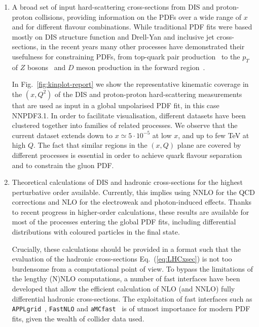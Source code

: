 \begin{enumerate}
\item A broad set of input hard-scattering cross-sections from DIS and proton-proton collisions, providing information on the PDFs
  over a wide range of $x$ and for different flavour combinations.
  While traditional PDF fits were based mostly on DIS structure function and Drell-Yan
  and inclusive jet
  cross-sections, in the recent years many other processes have demonstrated
  their usefulness for constraining PDFs, from top-quark pair production~\cite{Czakon:2016olj}
  to the $p_T$ of $Z$ bosons~\cite{Boughezal:2017nla}
  and $D$ meson production in the forward region~\cite{Gauld:2016kpd}.

  In Fig.~\ref{fig:kinplot-report} we show the representative kinematic coverage in the
    $(x,Q^2)$ of the DIS and proton-proton hard-scattering measurements that are
    used as input in a global unpolarised PDF fit, in this case NNPDF3.1.
    In order to facilitate visualisation, different
    datasets have been clustered together into families of
    related processes.
    We observe that the current dataset extends down to $x\simeq 5\cdot 10^{-5}$
    at low $x$, and up to few TeV at high $Q$.
    The fact that similar regions in the $(x,Q)$ plane are covered by
    different processes is essential in order to achieve quark
    flavour separation and to constrain the gluon PDF.

  \item Theoretical calculations of DIS and hadronic cross-sections
    for the highest perturbative order available.
    Currently, this implies using NNLO for the QCD corrections and NLO
    for the electroweak and photon-induced effects.
    Thanks to recent progress in higher-order calculations, these results
    are available for most of the processes entering the global
    PDF fits, including differential distributions with coloured particles
    in the final state.


    Crucially, these calculations should be provided in
    a format such that the evaluation of the hadronic
    cross-sections Eq.~(\ref{eq:LHCxsec}) is not too burdensome
    from a computational point of view.
    To bypass the limitations of the lengthy (N)NLO
    computations, a number of fast interfaces have
    been developed that allow the efficient calculation
    of NLO (and NNLO) fully differential hadronic cross-sections.
    The exploitation of fast interfaces such as {\tt APPLgrid}~\cite{Carli:2010rw},
    {\tt FastNLO} and {\tt aMCfast}~\cite{Bertone:2014zva} is of utmost importance
    for modern PDF fits, given the wealth of collider data used.


\end{enumerate}
